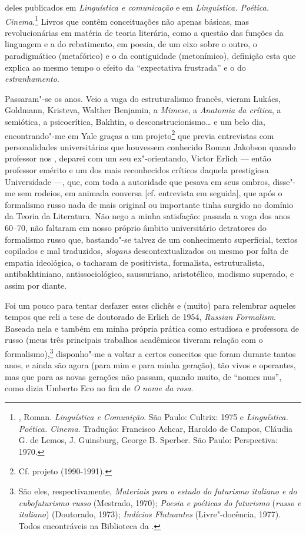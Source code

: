 deles publicados em \emph{Linguística e comunicação} e em
\emph{Linguística. Poética. Cinema}.\footnote{, Roman.
 \emph{Linguística e Comunição}. São Paulo: Cultrix: 1975 e
 \emph{Linguística. Poética. Cinema}. Tradução: Francisco Achcar, 
Haroldo de Campos, Cláudia G. de Lemos, J. Guinsburg, George B.
 Sperber. São Paulo: Perspectiva: 1970.} Livros que contêm conceituações
não apenas básicas, mas revolucionárias em matéria de teoria literária,
como a questão das funções da linguagem e a do rebatimento, em poesia, de
um eixo sobre o outro, o paradigmático (metafórico) e o da contiguidade
(metonímico), definição esta que explica ao mesmo tempo o efeito da
``expectativa frustrada'' e o do \emph{estranhamento}.

Passaram"-se os anos. Veio a vaga do estruturalismo francês, vieram
Lukács, Goldmann, Kristeva, Walther Benjamin, a \emph{Mimese}, a
\emph{Anatomia da crítica}, a semiótica, a psicocrítica, Bakhtin, o
desconstrucionismo\ldots{} e um belo dia, encontrando"-me em Yale graças a um
projeto\footnote{Cf. projeto  (1990-1991).} que previa
entrevistas com personalidades universitárias que houvessem conhecido
Roman Jakobson quando professor nos , deparei com um seu
ex"-orientando, Victor Erlich --- então professor emérito e um dos mais
reconhecidos críticos daquela prestigiosa Universidade ---, que, com toda
a autoridade que pesava em seus ombros, disse"-me sem rodeios, em animada
conversa [cf. entrevista em seguida], que após o formalismo russo nada de mais
original ou importante tinha surgido no domínio da Teoria da Literatura.
Não nego a minha satisfação: passada a voga dos anos 60--70, não faltaram
em nosso próprio âmbito universitário detratores do formalismo russo
que, bastando"-se talvez de um conhecimento superficial, textos
copilados e mal traduzidos, \emph{slogans} descontextualizados ou mesmo por
falta de empatia ideológica, o tacharam de positivista, formalista,
estruturalista, antibakhtiniano, antissociológico, saussuriano,
aristotélico, modismo superado, e assim por diante.

Foi um pouco para tentar desfazer esses clichês e (muito) para relembrar aqueles tempos
que reli a tese de doutorado de Erlich de 1954, \emph{Russian
Formalism}. Baseada nela e também em minha própria prática como
estudiosa e professora de russo (meus três principais trabalhos
acadêmicos tiveram relação com o formalismo),\footnote{São eles,
  respectivamente, \emph{Materiais para o estudo do futurismo italiano e
  do cubofuturismo russo} (Mestrado, 1970); \emph{Poesia e poéticas do
  futurismo} (\emph{russo e italiano}) (Doutorado, 1973); \emph{Indícios
  Flutuantes} (Livre"-docência, 1977). Todos encontráveis na Biblioteca
  da .} disponho"-me a voltar a certos conceitos que foram durante
tantos anos, e ainda são agora (para mim e para minha geração), tão
vivos e operantes, mas que para as novas gerações não passam, quando
muito, de ``nomes nus'', como dizia Umberto Eco no fim de \emph{O nome
da rosa}.



